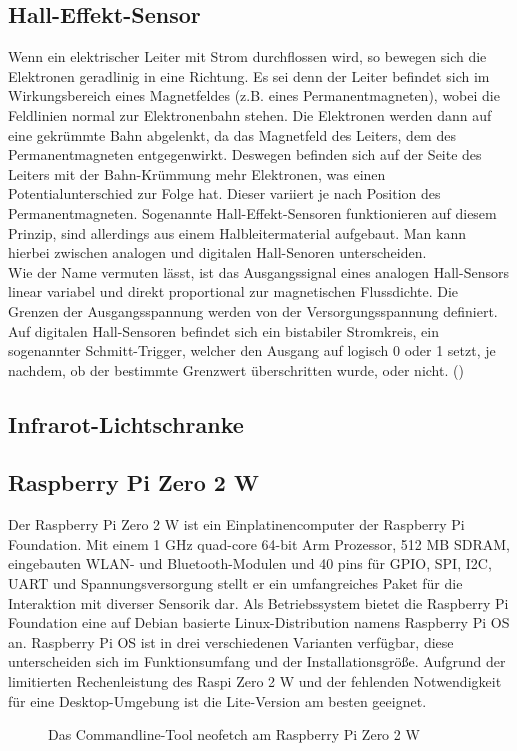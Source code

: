 \subsection{Hall-Effekt-Sensor}
\label{subsec:tHall}
Wenn ein elektrischer Leiter mit Strom durchflossen wird, so bewegen sich die Elektronen geradlinig in eine Richtung. Es sei denn der Leiter befindet sich im Wirkungsbereich eines Magnetfeldes (z.B. eines Permanentmagneten), wobei die Feldlinien normal zur Elektronenbahn stehen. Die Elektronen werden dann auf eine gekrümmte Bahn abgelenkt, da das Magnetfeld des Leiters, dem des Permanentmagneten entgegenwirkt. Deswegen befinden sich auf der Seite des Leiters mit der Bahn-Krümmung mehr Elektronen, was einen Potentialunterschied zur Folge hat. Dieser variiert je nach Position des Permanentmagneten. Sogenannte Hall-Effekt-Sensoren funktionieren auf diesem Prinzip, sind allerdings aus einem Halbleitermaterial aufgebaut. Man kann hierbei zwischen analogen und digitalen Hall-Senoren unterscheiden.\\
Wie der Name vermuten lässt, ist das Ausgangssignal eines analogen Hall-Sensors linear variabel und direkt proportional zur magnetischen Flussdichte. Die Grenzen der Ausgangsspannung werden von der Versorgungsspannung definiert. Auf digitalen Hall-Sensoren befindet sich ein bistabiler Stromkreis, ein sogenannter Schmitt-Trigger, welcher den Ausgang auf logisch 0 oder 1 setzt, je nachdem, ob der bestimmte Grenzwert überschritten wurde, oder nicht. (\cite{rsHALL})

\subsection{Infrarot-Lichtschranke}
\label{subsec:tIR}

\subsection{Raspberry Pi Zero 2 W}
\label{subsec:tRasPi}
Der Raspberry Pi Zero 2 W ist ein Einplatinencomputer der Raspberry Pi Foundation. Mit einem 1 \ac{GHz} quad-core 64-bit Arm Prozessor, 512 \ac{MB} \ac{SDRAM}, eingebauten \ac{WLAN}- und Bluetooth-Modulen und 40 pins für \ac{GPIO}, \ac{SPI}, \ac{I2C}, \ac{UART} und Spannungsversorgung stellt er ein umfangreiches Paket für die Interaktion mit diverser Sensorik dar. Als Betriebssystem bietet die Raspberry Pi Foundation eine auf Debian basierte Linux-Distribution namens Raspberry Pi \ac{OS} an. Raspberry Pi \ac{OS} ist in drei verschiedenen Varianten verfügbar, diese unterscheiden sich im Funktionsumfang und der Installationsgröße. Aufgrund der limitierten Rechenleistung des \ac{Raspi} Zero 2 W und der fehlenden Notwendigkeit für eine Desktop-Umgebung ist die Lite-Version am besten geeignet.
\begin{figure}[h]
\centering
\missingfigure{}
\caption{Das Commandline-Tool neofetch am Raspberry Pi Zero 2 W}
\label{fig:pineofetch}
\end{figure}

